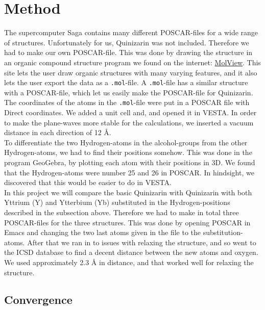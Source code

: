 \documentclass{article}
\begin{document}
\vspace{1cm}

\section{Method}    \label{sec:Method}

  The supercomputer Saga contains many different POSCAR-files for a wide range of structures. Unfortunately for us, Quinizarin was not included. Therefore we had to make our own POSCAR-file. This was done by drawing the structure in an organic compound structure program we found on the internet: \href{https://molview.org}{MolView}. This site lets the user draw organic structures with many varying features, and it also lets the user export the data as a \texttt{.mol}-file. A \texttt{.mol}-file has a similar structure with a POSCAR-file, which let us easily make the POSCAR-file for Quinizarin. \\

  The coordinates of the atoms in the \texttt{.mol}-file were put in a POSCAR file with Direct coordinates. We added a unit cell and, and opened it in VESTA. In order to make the plane-waves more stable for the calculations, we inserted a vacuum distance in each direction of 12 Å. \\

  To differentiate the two Hydrogen-atoms in the alcohol-groups from the other Hydrogen-atoms, we had to find their positions somehow. This was done in the program GeoGebra, by plotting each atom with their positions in 3D. We found that the Hydrogen-atoms were number 25 and 26 in POSCAR. In hindsight, we discovered that this would be easier to do in VESTA. \\

  In this project we will compare the basic Quinizarin with Quinizarin with both Yttrium (Y) and Ytterbium (Yb) substituted in the Hydrogen-positions described in the subsection above. Therefore we had to make in total three POSCAR-files for the three structures. This was done by opening POSCAR in Emacs and changing the two last atoms given in the file to the substitution-atoms. After that we ran in to issues with relaxing the structure, and so went to the ICSD database to find a decent distance between the new atoms and oxygen. We used approximately 2.3 Å in distance, and that worked well for relaxing the structure. \\


  \subsection{Convergence}  \label{sec:Convergence}
\end{document}
